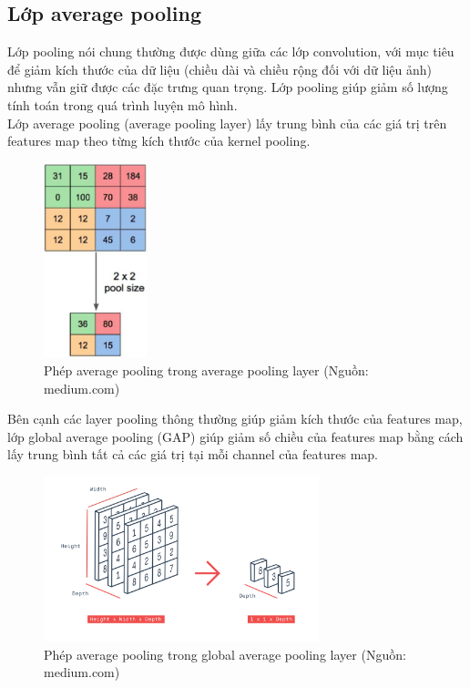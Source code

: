 {    \subsection{Lớp average pooling}
    Lớp pooling nói chung thường được dùng giữa các lớp convolution, với mục tiêu để giảm kích thước của dữ liệu (chiều dài và chiều rộng đối với dữ liệu ảnh) nhưng vẫn giữ được các đặc trưng quan trọng. Lớp pooling giúp giảm số lượng tính toán trong quá trình luyện mô hình.\\
    Lớp average pooling (average pooling layer) lấy trung bình của các giá trị trên features map theo từng kích thước của kernel pooling.
    \begin{figure}[H]
    \centering
    \includegraphics[width=3cm] {images/avg_pool.png}
    \caption{Phép average pooling trong average pooling layer (Nguồn: medium.com)}
    \label{fig:avg_pool}
    \end{figure}
    \noindent Bên cạnh các layer pooling thông thường giúp giảm kích thước của features map, lớp global average pooling (GAP) giúp giảm số chiều của features map bằng cách lấy trung bình tất cả các giá trị tại mỗi channel của features map.
    \begin{figure}[H]
    \centering
    \includegraphics[width=8cm] {images/gap.png}
    \caption{Phép average pooling trong global average pooling layer (Nguồn: medium.com)}
    \label{fig:gap}
    \end{figure}

}
